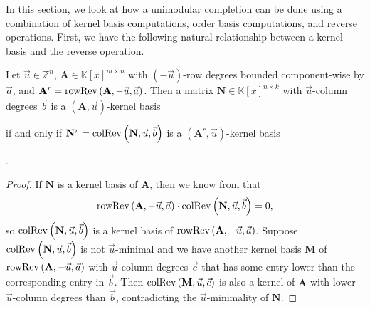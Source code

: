 In this section, we look at how a unimodular completion can be done
using a combination of kernel basis computations, order basis computations,
and reverse operations. First, we have the following natural relationship
between a kernel basis and the reverse operation.
\begin{lem}
\label{lem:reverseNullspaceBasis}Let $\vec{u}\in\mathbb{Z}^{n}$,
$\mathbf{A}\in\mathbb{K}\left[x\right]^{m\times n}$ with $(-\vec{u})$-row
degrees bounded component-wise by $\vec{a}$, and $\mathbf{A}^{r}=\operatorname{rowRev}\left(\mathbf{A},-\vec{u},\vec{a}\right)$.
Then a matrix $\mathbf{N}\in\mathbb{K}\left[x\right]^{n\times k}$
with $\vec{u}$-column degrees $\vec{b}$ is a $(\mathbf{A},\vec{u})$-kernel
basis %
\begin{comment}
$\vec{u}$-minimal kernel basis of $\mathbf{A}$ 
\end{comment}
if and only if $\mathbf{N}^{r}=\operatorname{colRev}\left(\mathbf{N},\vec{u},\vec{b}\right)$
is a $(\mathbf{A}^{r},\vec{u})$-kernel basis%
\begin{comment}
$\vec{u}$-minimal kernel basis of $\rowRev\left(\mathbf{A},-\vec{u},\vec{a}\right)$
\end{comment}
.\end{lem}
\begin{proof}
If $\mathbf{N}$ is a kernel basis of $\mathbf{A}$, then we know
from  that 
\[
\operatorname{rowRev}\left(\mathbf{A},-\vec{u},\vec{a}\right)\cdot\operatorname{colRev}\left(\mathbf{N},\vec{u},\vec{b}\right)=0,
\]
so $\operatorname{colRev}\left(\mathbf{N},\vec{u},\vec{b}\right)$ is a kernel basis
of $\operatorname{rowRev}\left(\mathbf{A},-\vec{u},\vec{a}\right)$. Suppose $\operatorname{colRev}\left(\mathbf{N},\vec{u},\vec{b}\right)$
is not $\vec{u}$-minimal and we have another kernel basis $\mathbf{M}$
of $\operatorname{rowRev}\left(\mathbf{A},-\vec{u},\vec{a}\right)$ with $\vec{u}$-column
degrees $\vec{c}$ that has some entry lower than the corresponding
entry in $\vec{b}$. Then $\operatorname{colRev}\left(\mathbf{M},\vec{u},\vec{c}\right)$
is also a kernel of $\mathbf{A}$ with lower $\vec{u}$-column degrees
than $\vec{b}$, contradicting the $\vec{u}$-minimality of $\mathbf{N}$.
\end{proof}


